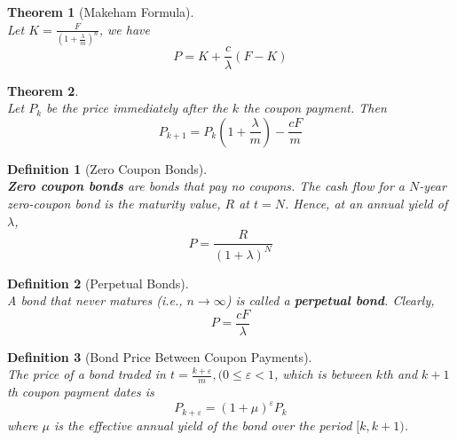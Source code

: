\documentclass[11pt]{article}
\newtheorem{definition}{Definition}[section]
\newtheorem{theorem}{Theorem}[section]
\theoremstyle{definition}
\begin{document}
\begin{theorem}[Makeham Formula]
\hfill\\\normalfont Let $K=\frac{F}{\left(1+\frac{\lambda}{m}\right)^n}$, we have
\[
P=K+\frac{c}{\lambda}(F-K)
\]
\end{theorem}
\begin{theorem}
\hfill\\\normalfont
Let $P_k$ be the price immediately after the $k$ the coupon payment. Then
\[
P_{k+1}=P_{k}\left(1+\frac{\lambda}{m}\right)-\frac{cF}{m}
\]
\end{theorem}
\begin{definition}[Zero Coupon Bonds]
\hfill\\\normalfont \textbf{Zero coupon bonds} are bonds that pay no coupons. The cash flow for a $N$-year zero-coupon bond is the maturity value, $R$ at $t=N$. Hence, at an annual yield of $\lambda$,
\[
P=\frac{R}{(1+\lambda)^N}
\]
\end{definition}
\begin{definition}[Perpetual Bonds]
\hfill\\\normalfont A bond that never matures (i.e., $n\to \infty$) is called a \textbf{perpetual bond}. Clearly,
\[
P=\frac{cF}{\lambda}
\]
\end{definition}
\begin{definition}[Bond Price Between Coupon Payments]
\hfill\\\normalfont The price of a bond traded in $t=\frac{k+\varepsilon}{m}, (0\leq \varepsilon < 1$, which is between $k$th and $k+1$th coupon payment dates is
\[
P_{k+\varepsilon} = (1+\mu)^\varepsilon P_k
\]
where $\mu$ is the effective annual yield of the bond over the period $[k,k+1)$.
\end{definition}
\end{document}
